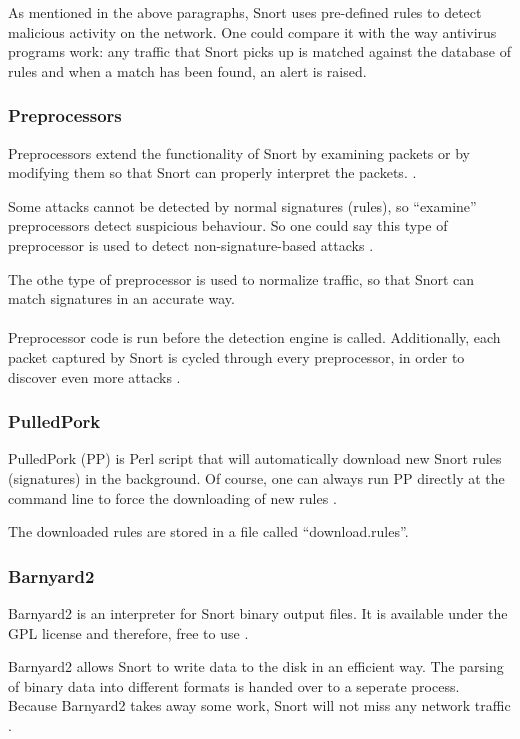 As mentioned in the above paragraphs, Snort uses pre-defined rules to detect malicious activity on the network. One could compare it with the way antivirus programs work: any traffic that Snort picks up is matched against the database of rules and when a match has been found, an alert is raised.

\subsubsection{Preprocessors}

Preprocessors extend the functionality of Snort by examining packets or by modifying them so that Snort can properly interpret the packets. \citep{Preprocessor1}.

Some attacks cannot be detected by normal signatures (rules), so ``examine'' preprocessors detect suspicious behaviour. So one could say this type of preprocessor is used to detect non-signature-based attacks \citep{Preprocessor1}. 

The othe type of preprocessor is used to normalize traffic, so that Snort can match signatures in an accurate way.\\ \\
Preprocessor code is run before the detection engine is called. Additionally, each packet captured by Snort is cycled through every preprocessor, in order to discover even more attacks \citep{Preprocessor2}.

\subsubsection{PulledPork}

PulledPork (PP) is Perl script that will automatically download new Snort rules (signatures) in the background. Of course, one can always run PP directly at the command line to force the downloading of new rules \citep{PP}.

The downloaded rules are stored in a file called ``download.rules''.

\subsubsection{Barnyard2}

Barnyard2 is an interpreter for Snort binary output files. It is available under the GPL license and therefore, free to use \citep{Barnyard1}.

Barnyard2 allows Snort to write data to the disk in an efficient way. The parsing of binary data into different formats is handed over to a seperate process. Because Barnyard2 takes away some work, Snort will not miss any network traffic \citep{Barnyard2}.

